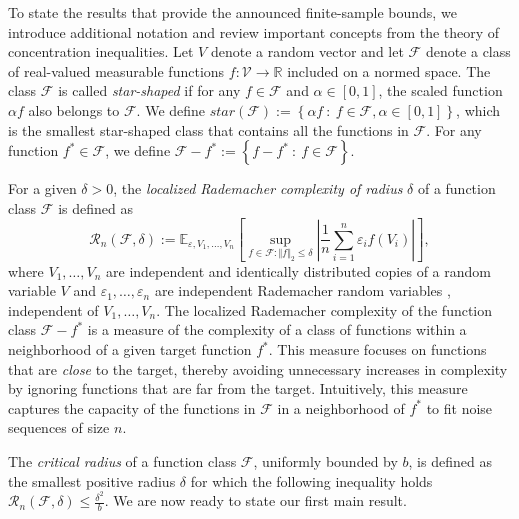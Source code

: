 \documentclass[twoside,11pt]{article}
\newcommand{\mc}{\mathcal}
\begin{document}
To state the results that provide the announced finite-sample bounds, we introduce additional notation and review important concepts from the theory of concentration inequalities. Let $V$ denote a random vector and let $\mc{F}$ denote a class of real-valued measurable functions $f:\mc{V}\rightarrow\mathbb{R}$ included on a normed space. The class $\mc{F}$ is called \textit{star-shaped} if for any $f\in\mc{F}$ and $\alpha\in[0,1]$, the scaled function $\alpha f$ also belongs to $\mc{F}$. We define $star\left(\mc{F}\right):=\left\{\alpha f\: : \: f\in\mc{F},\alpha\in[0,1]\right\}$, which is the smallest star-shaped class that contains all the functions in $\mc{F}$. For any function $f^*\in\mc{F}$, we define  $\mc{F}-f^*:=\left\{f-f^*\: : \: f\in\mc{F}\right\}$.

For a given $\delta>0$, the \textit{localized Rademacher complexity of radius} $\delta$ of a function class $\mc{F}$ is defined as
\[
\mc{R}_n\left(\mc{F},\delta\right):=\mathbb{E}_{\varepsilon,V_1,\dots,V_n}\left[\sup_{f\in\mc{F}:\Vert f\Vert_2\le\delta}\left\vert\frac{1}{n}\sum_{i=1}^n\varepsilon_if(V_i)\right\vert\right],
\]
where $V_1,\dots,V_n$ are independent and identically distributed copies of a random variable $V$ and $\varepsilon_1,\dots,\varepsilon_n$ are independent Rademacher random variables \citep{bartlett2005local}, independent of $V_1,\dots,V_n$. The localized Rademacher complexity of the function class $\mc{F} - f^*$ is a measure of the complexity of a class of functions within a neighborhood of a given target function $f^*$. This measure focuses on functions that are \textit{close} to the target, thereby avoiding unnecessary increases in complexity by ignoring functions that are far from the target. Intuitively, this measure captures the capacity of the functions in $\mc{F}$ in a neighborhood of $f^*$ to fit noise sequences of size $n$.

The \textit{critical radius} of a function class $\mc{F}$, uniformly bounded by $b$, is defined as the smallest positive radius $\delta$ for which the following inequality holds $\mc{R}_n\left(\mc{F},\delta\right)\le\frac{\delta^2}{b}$. We are now ready to state our first main result.
\end{document}
